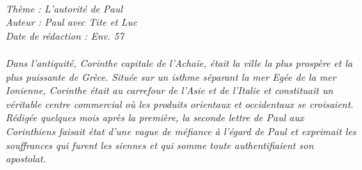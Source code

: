 \BFont
\noindent\hrulefill
{\footnotesize
\textit{
\bigskip
{\centering{}
\\Thème : L'autorité de Paul
\\Auteur : Paul avec Tite et Luc
\\Date de rédaction : Env. 57\\}
}
\textit{
\\Dans l’antiquité, Corinthe capitale de l’Achaïe, était la ville la plus prospère et la plus puissante de Grèce. Située sur un isthme séparant la mer Egée de la mer Ionienne, Corinthe était au carrefour de l’Asie et de l’Italie et constituait un véritable centre commercial où les produits orientaux et occidentaux se croisaient.
\\Rédigée quelques mois après la première, la seconde lettre de Paul aux Corinthiens faisait état d’une vague de méfiance à l’égard de Paul et exprimait les souffrances qui furent les siennes et qui somme toute authentifiaient son apostolat.\bigskip
}
}
\par\nobreak\noindent\hrulefill
